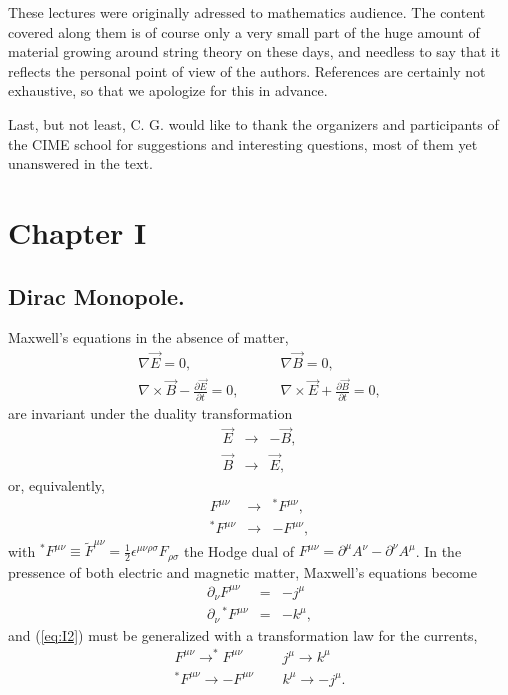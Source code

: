 \vspace{2 mm}
  
These lectures were originally adressed to mathematics audience.
The content covered along them is of course only a very small
part of the huge amount of material growing around string theory
on these days, and needless to say that it reflects the personal
point of view of the authors. References are certainly not
exhaustive, so that we apologize for this in advance. 
  
Last, but not least, C. G. would like to thank the organizers and
participants of the CIME school for suggestions and interesting
questions, most of them yet unanswered in the text.

\pagebreak




\section{Chapter I}

\subsection{Dirac Monopole.}

Maxwell's equations in the absence of matter,
\begin{eqnarray}
	\nabla \vec{E} = 0, & \: \: \: \: \: \: & \nabla \vec{B} = 0,
				\nonumber \\
	\nabla \times \vec{B} - \frac {\partial \vec{E}}{\partial
t} = 0, & \: \: \: \: \: \: & \nabla \times \vec{E} + \frac
{\partial \vec{B}}{\partial t} = 0,
\label{eq:I1} 
\end{eqnarray}
are invariant under the duality transformation
\begin{eqnarray}
\vec{E} & \longrightarrow & - \vec{B}, \nonumber \\
\vec{B} & \longrightarrow & \vec{E},
\label{eq:I2}
\end{eqnarray}
or, equivalently,
\begin{eqnarray}
F^{\mu \nu} & \longrightarrow &  ^{\ast}F^{\mu
	\nu}, \nonumber \\
^{\ast}F^{\mu \nu} & \longrightarrow & - F^{\mu
	\nu},
\label{eq:I3}
\end{eqnarray}
with $^{\ast}F^{\mu \nu} \equiv \tilde{F}^{\mu \nu}= \frac {1}{2} \epsilon ^{\mu \nu \rho \sigma}
F_{\rho \sigma}$ the Hodge dual of $F^{\mu \nu} =
\partial^{\mu} A^{\nu}- \partial^{\nu} A^{\mu}$. In the pressence
of both electric and magnetic matter, Maxwell's equations become
\begin{eqnarray}
	   \partial_{\nu} F^{\mu \nu} & = & - j^{\mu} \nonumber \\
\partial_{\nu} \, ^{\ast} F^{\mu \nu} & = & - k^{\mu},
\label{eq:I4}
\end{eqnarray}
and (\ref{eq:I2}) must be generalized with a transformation law
for the currents,
\begin{eqnarray}
F^{\mu \nu}  \rightarrow  ^{\ast} F^{\mu \nu} & \> \> &
j^{\mu}  \rightarrow   k^{\mu}  \nonumber \\
^{\ast} F^{\mu \nu}  \rightarrow - F^{\mu \nu} &
\> \> &
k^{\mu}  \rightarrow  - j^{\mu}.
\label{eq:I5}
\end{eqnarray}
  
